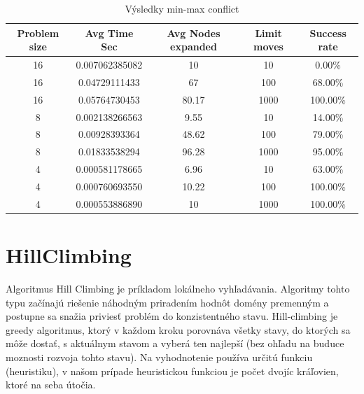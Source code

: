 \begin{table}[ht]
  \centering
  \begin{tabular}{|c|c|c|c|c|}
    \hline
    \textbf{Problem size} & \textbf{Avg Time Sec} & \textbf{Avg Nodes expanded} & \textbf{Limit moves} & \textbf{Success rate} \\
    \hline
    16                    & 0.007062385082        & 10                          & 10                   & 0.00\%                \\
    16                    & 0.04729111433         & 67                          & 100                  & 68.00\%               \\
    16                    & 0.05764730453         & 80.17                       & 1000                 & 100.00\%              \\
    \hline
    8                     & 0.002138266563        & 9.55                        & 10                   & 14.00\%               \\
    8                     & 0.00928393364         & 48.62                       & 100                  & 79.00\%               \\
    8                     & 0.01833538294         & 96.28                       & 1000                 & 95.00\%               \\
    \hline
    4                     & 0.000581178665        & 6.96                        & 10                   & 63.00\%               \\
    4                     & 0.000760693550        & 10.22                       & 100                  & 100.00\%              \\
    4                     & 0.000553886890        & 10                          & 1000                 & 100.00\%              \\
    \hline
  \end{tabular}
  \caption{Výsledky min-max conflict}\label{tab:table}
\end{table}




\section*{HillClimbing}

Algoritmus Hill Climbing je príkladom lokálneho vyhľadávania. Algoritmy tohto typu začínajú riešenie náhodným priradením hodnôt domény premenným a postupne sa snažia priviesť problém do konzistentného stavu.
Hill-climbing je greedy algoritmus, ktorý v každom kroku porovnáva všetky stavy, do ktorých sa môže dostať, s aktuálnym stavom a vyberá ten najlepší (bez ohľadu na buduce moznosti rozvoja tohto stavu). Na vyhodnotenie používa určitú funkciu (heuristiku), v našom prípade heuristickou funkciou je počet dvojíc kráľovien, ktoré na seba útočia.

